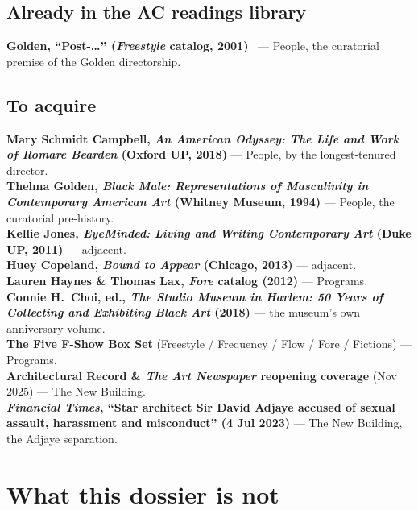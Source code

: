 \documentclass[10pt,letterpaper,twocolumn]{article}
\begin{document}
\subsection{Already in the AC readings library}

\textbf{Golden, ``Post-\dots'' (\emph{Freestyle} catalog, 2001)}~\citep{golden2001freestyle} --- People, the curatorial premise of the Golden directorship.

\subsection{To acquire}

\textbf{Mary Schmidt Campbell, \emph{An American Odyssey: The Life and Work of Romare Bearden} (Oxford UP, 2018)} --- People, by the longest-tenured director.\\
\textbf{Thelma Golden, \emph{Black Male: Representations of Masculinity in Contemporary American Art} (Whitney Museum, 1994)} --- People, the curatorial pre-history.\\
\textbf{Kellie Jones, \emph{EyeMinded: Living and Writing Contemporary Art} (Duke UP, 2011)} --- adjacent.\\
\textbf{Huey Copeland, \emph{Bound to Appear} (Chicago, 2013)} --- adjacent.\\
\textbf{Lauren Haynes \& Thomas Lax, \emph{Fore} catalog (2012)} --- Programs.\\
\textbf{Connie H.~Choi, ed., \emph{The Studio Museum in Harlem: 50 Years of Collecting and Exhibiting Black Art} (2018)} --- the museum's own anniversary volume.\\
\textbf{The Five F-Show Box Set} (Freestyle / Frequency / Flow / Fore / Fictions) --- Programs.\\
\textbf{Architectural Record \& \emph{The Art Newspaper} reopening coverage} (Nov 2025) --- The New Building.\\
\textbf{\emph{Financial Times}, ``Star architect Sir David Adjaye accused of sexual assault, harassment and misconduct'' (4 Jul 2023)} --- The New Building, the Adjaye separation.

\section{What this dossier is not}
\end{document}
